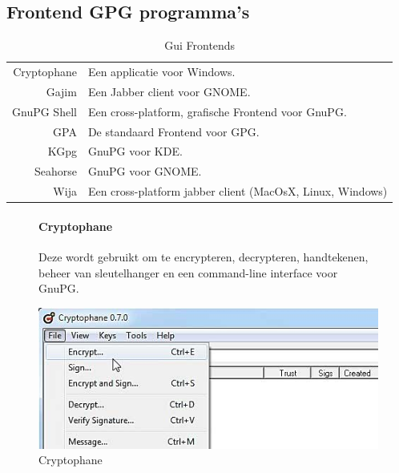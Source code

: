 \documentclass[12pt]{article}
\begin{document}
			
			\subsection{Frontend GPG programma's}\label{GUI} 
				\begin{table}[!ht]
					\begin{center}
						\begin{tabular}{r|l}
							Cryptophane	&	Een applicatie voor Windows.\\
							Gajim		&	Een Jabber client voor GNOME.\\
							GnuPG Shell	&	Een cross-platform, grafische Frontend voor GnuPG.\\
							GPA			&	De standaard Frontend voor GPG.\\
							KGpg		&	GnuPG voor KDE.\\
							Seahorse	&	GnuPG voor GNOME.\\
							Wija		&	Een cross-platform jabber client (MacOsX, Linux, 														Windows)\\
						\end{tabular}
					\end{center}
					\caption{Gui Frontends}
				\end{table}

				\begin{figure}[!ht]
					\paragraph{Cryptophane}
						Deze wordt gebruikt om te encrypteren, decrypteren, handtekenen, beheer van 							sleutelhanger en een command-line interface voor GnuPG.\\
					\begin{center}
						\includegraphics[scale=0.6]{Pictures/cryptophane}
					\end{center}
					\caption{Cryptophane}
				\end{figure}	
\end{document}
